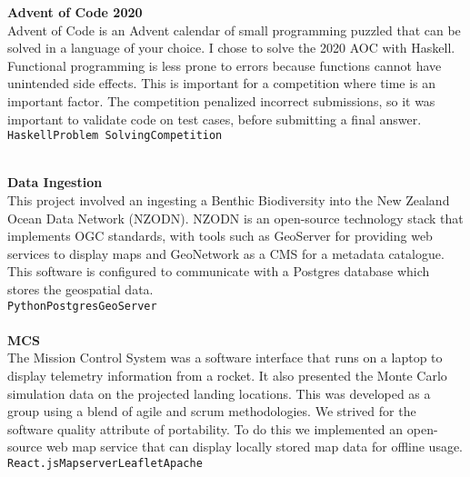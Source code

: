 \documentclass[9pt]{developercv}
\begin{document}
{
	{\textbf{Advent of Code 2020}
	\\
	Advent of Code is an Advent calendar of small programming puzzled that can be solved in a language of your choice. I chose to solve the 2020 AOC with Haskell. Functional programming is less prone to errors because functions cannot have unintended side effects. This is important for a competition where time is an important factor. The competition penalized incorrect submissions, so it was important to validate code on test cases, before submitting a final answer.
	\\
	{\texttt{Haskell}\slashsep\texttt{Problem Solving}\slashsep\texttt{Competition}}
	\\\\
}
{
	{\textbf{Data Ingestion}
	\\
	This project involved an ingesting a Benthic Biodiversity into the New Zealand Ocean Data Network (NZODN). NZODN is an open-source technology stack that implements OGC standards, with tools such as GeoServer for providing web services to display maps and GeoNetwork as a CMS for a metadata catalogue. This software is configured to communicate with a Postgres database which stores the geospatial data.
	\\
	{\texttt{Python}\slashsep\texttt{Postgres}\slashsep\texttt{GeoServer}}
	\\\\
}
{
	{\textbf{MCS}}
	\\
	The Mission Control System was a software interface that runs on a laptop to display telemetry information from a rocket. It also presented the Monte Carlo simulation data on the projected landing locations. This was developed as a group using a blend of agile and scrum methodologies. We strived for the software quality attribute of portability. To do this we implemented an open-source web map service that can display locally stored map data for offline usage.
	\\
	{\texttt{React.js}\slashsep\texttt{Mapserver}\slashsep\texttt{Leaflet}\texttt{Apache}}
}



}}
\end{document}

